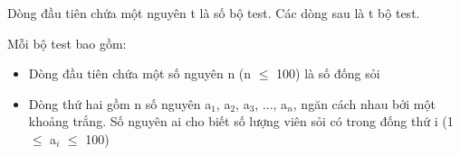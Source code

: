 Dòng đầu tiên chứa một nguyên t là số bộ test. Các dòng sau là t bộ test.

Mỗi bộ test bao gồm:
\begin{itemize}
	\item Dòng đầu tiên chứa một số nguyên n (n  $\le$  100) là số đống sỏi
	\item Dòng thứ hai gồm n số nguyên a$_1$, a$_2$, a$_3$, ..., a$_n$, ngăn cách nhau bởi một khoảng trắng. Số nguyên ai cho biết số lượng viên sỏi có trong đống thứ i (1  $\le$  a$_i $  $\le$  100)
\end{itemize}

\
